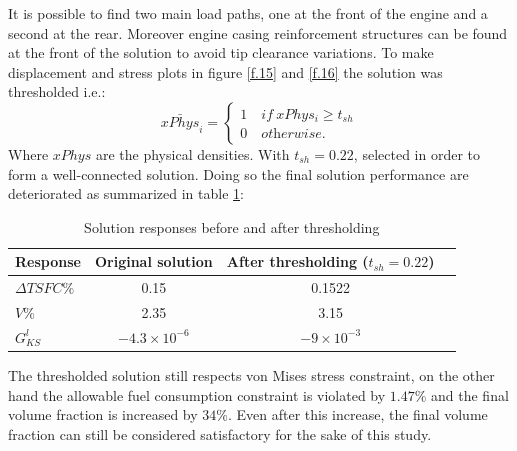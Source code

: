   It is possible to find two main load paths, one at the front of the engine and a second at the rear. Moreover engine casing reinforcement structures can be found at the front of the solution to avoid tip clearance variations. 
 To make displacement and stress plots in figure \ref{f.15} and \ref{f.16} the solution was thresholded i.e.: 
  \begin{equation}
      \bar{xPhys}_i=\begin{cases}
             1 \quad \textit{if} \ xPhys_i\geq t_{sh}\\
             0 \quad \textit{otherwise.}
             \end{cases}
  \end{equation}
  Where $xPhys$ are the physical densities.
  With $t_{sh}=0.22$, selected in order to form a well-connected solution.
  Doing so the final solution performance are deteriorated as summarized in table \ref{tab:table3}:\\
  \begin{table}[h]
         \caption{\label{tab:table3} Solution responses before and after thresholding }
          \centering
          \begin{tabular}{lccc}
          \hline
           Response& Original solution& After thresholding ($t_{sh}=0.22$) \\\hline
         $\Delta TSFC \%$ & 0.15 & 0.1522 \\
         $V \%$ & 2.35 & 3.15 \\
         $G_{KS}^l$ & $-4.3\times 10^{-6}$ & $-9\times 10^{-3}$ \\
          \hline
          \end{tabular}
          \end{table} 
 The thresholded solution still respects von Mises stress constraint, on the other hand the allowable fuel consumption constraint is violated by $1.47\%$ and the final volume fraction is increased by $34\%$. Even after this increase, the final volume fraction can still be considered satisfactory for the sake of this study. 
 
